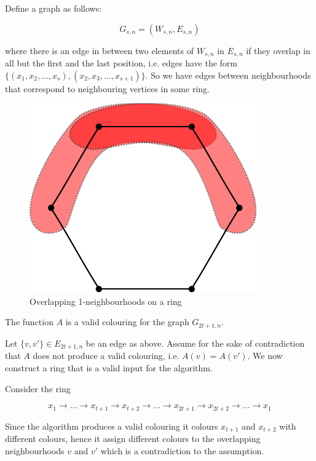 Define a graph as follows:

\[G_{s,n} = (W_{s,n},E_{s,n})\]

where there is an edge in between two elements of $W_{s,n}$ in $E_{s,n}$ if they overlap in all but the first and the last position, i.e. edges have the form $\{(x_1,x_2,\ldots,x_s),(x_2,x_3,\ldots,x_{s+1})\}$. So we have edges between neighbourhoods that correspond to neighbouring vertices in some ring.

\begin{figure}[hbt]
\begin{center}
\includegraphics{./images/ring.pdf}
\end{center}
\caption{Overlapping 1-neighbourhoods on a ring}
\end{figure}

\begin{lem} The function $A$ is a valid colouring for the graph $G_{2t+1,n}$.\end{lem}

\begin{pr} Let $\{v,v'\}\in E_{2t+1,n}$ be an edge as above. Assume for the sake of contradiction that $A$ does not produce a valid colouring, i.e. $A(v)=A(v')$. We now construct a ring that is a valid input for the algorithm.

Consider the ring 

\[x_1\rightarrow \ldots \rightarrow x_{t+1} \rightarrow x_{t+2} \rightarrow \ldots \rightarrow x_{2t+1} \rightarrow x_{2t+2} \rightarrow \ldots \rightarrow x_1\] 


Since the algorithm produces a valid colouring it colours $x_{t+1}$ and $x_{t+2}$ with different colours, hence it assign different colours to the overlapping neighbourhoods $v$ and $v'$ which is a contradiction to the assumption.
\end{pr}

